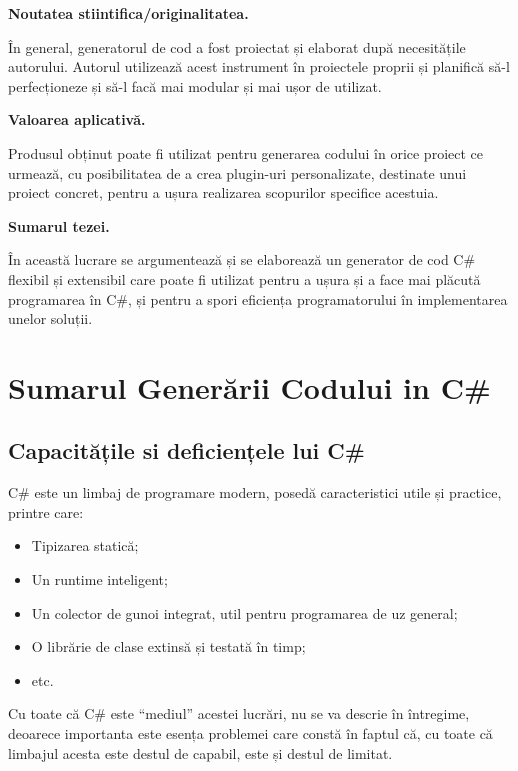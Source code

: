 \documentclass[a4paper,12pt]{report}
\begin{document}
\textbf{Noutatea stiintifica/originalitatea.}

În general, generatorul de cod a fost proiectat și elaborat după necesitățile autorului.
Autorul utilizează acest instrument în proiectele proprii și planifică să-l perfecționeze și să-l facă mai modular și mai ușor de utilizat.

\textbf{Valoarea aplicativă.}

Produsul obținut poate fi utilizat pentru generarea codului în orice proiect ce urmează,
cu posibilitatea de a crea plugin-uri personalizate, destinate unui proiect concret,
pentru a ușura realizarea scopurilor specifice acestuia.

\textbf{Sumarul tezei.}

În această lucrare se argumentează și se elaborează un generator de cod C\# flexibil și extensibil care poate fi utilizat pentru a ușura și a face mai plăcută programarea în C\#, și pentru a spori eficiența programatorului în implementarea unelor soluții.

\chapter{Sumarul Generării Codului in C\#}

\section{Capacitățile si deficiențele lui C\#}


{C\# este un limbaj de programare modern, posedă caracteristici utile și practice}\cite{tour_of_csharp}, printre care:
\begin{itemize}
  \item Tipizarea statică;
  \item Un runtime inteligent;
  \item Un colector de gunoi integrat, util pentru programarea de uz general;
  \item O librărie de clase extinsă și testată în timp;
  \item etc.
\end{itemize}

Cu toate că C\# este ``mediul'' acestei lucrări, nu se va descrie în întregime,
deoarece importanta este esența problemei care constă în faptul că, cu toate că limbajul acesta este destul de capabil, este și destul de limitat.
\end{document}
